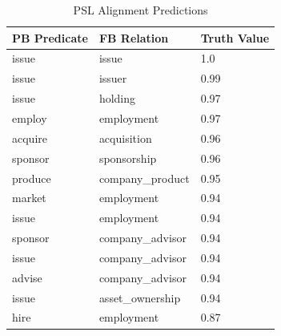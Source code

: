 \begin{table} [ht]
\begin{center}
\small{
\begin{tabular}{p{3cm}p{3cm}p{2cm}}
\noalign{\smallskip}
\hline
PB Predicate & FB Relation & Truth Value\\	
\hline
issue & issue & 1.0 \\
issue &issuer & 0.99  \\
issue & holding & 0.97\\
employ	& employment	& 0.97\\
acquire	&acquisition	& 0.96\\
sponsor	&sponsorship&	 0.96\\
produce	&company\_product&	0.95\\
market	&employment &	0.94\\
issue	&employment &	0.94\\
sponsor & company\_advisor & 0.94\\
issue & company\_advisor & 0.94\\
advise & company\_advisor & 0.94\\
issue & asset\_ownership & 0.94\\
hire & employment & 0.87\\

\hline
\end{tabular}
}
\caption{PSL Alignment Predictions}
\vspace{-0.4cm}
\end{center}
\end{table}



